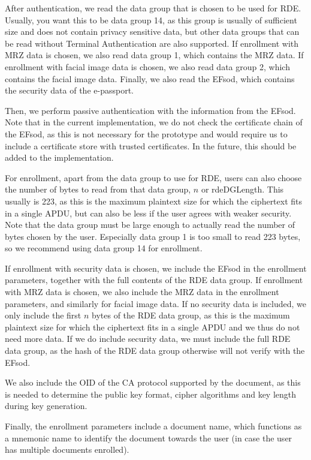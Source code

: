 After authentication, we read the data group that is chosen to be used for RDE.
Usually, you want this to be data group 14, as this group is usually of sufficient size and does not contain privacy sensitive data, but other data groups that can be read without Terminal Authentication are also supported.
If enrollment with MRZ data is chosen, we also read data group 1, which contains the MRZ data.
If enrollment with facial image data is chosen, we also read data group 2, which contains the facial image data.
Finally, we also read the EFsod, which contains the security data of the e-passport.

Then, we perform passive authentication with the information from the EFsod.
Note that in the current implementation, we do not check the certificate chain of the EFsod, as this is not necessary for the prototype and would require us to include a certificate store with trusted certificates.
In the future, this should be added to the implementation.

For enrollment, apart from the data group to use for RDE, users can also choose the number of bytes to read from that data group, $n$ or \textsf{rdeDGLength}.
This usually is 223, as this is the maximum plaintext size for which the ciphertext fits in a single APDU, but can also be less if the user agrees with weaker security.
Note that the data group must be large enough to actually read the number of bytes chosen by the user.
Especially data group 1 is too small to read 223 bytes, so we recommend using data group 14 for enrollment.

If enrollment with security data is chosen, we include the EFsod in the enrollment parameters, together with the full contents of the RDE data group.
If enrollment with MRZ data is chosen, we also include the MRZ data in the enrollment parameters, and similarly for facial image data.
If no security data is included, we only include the first $n$ bytes of the RDE data group, as this is the maximum plaintext size for which the ciphertext fits in a single APDU and we thus do not need more data.
If we do include security data, we must include the full RDE data group, as the hash of the RDE data group otherwise will not verify with the EFsod.

We also include the OID of the CA protocol supported by the document, as this is needed to determine the public key format, cipher algorithms and key length during key generation.

Finally, the enrollment parameters include a document name, which functions as a mnemonic name to identify the document towards the user (in case the user has multiple documents enrolled).

